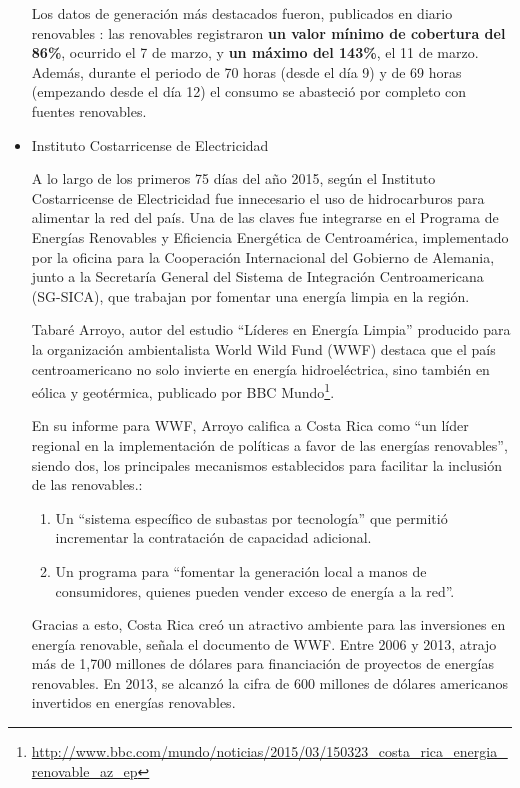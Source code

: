 \begin{itemize}
  Los datos de generación más destacados fueron, publicados en diario
  renovables \cite{sfdez18}: las renovables registraron \textbf{un valor mínimo de
  cobertura del 86\%}, ocurrido el 7 de marzo, y \textbf{un máximo del
  143\%}, el 11 de marzo. Además, durante el periodo de 70 horas (desde
  el día 9) y de 69 horas (empezando desde el día 12) el consumo se
  abasteció por completo con fuentes renovables.
\item
  Instituto Costarricense de Electricidad

  A lo largo de los primeros 75 días del año 2015, según el Instituto
  Costarricense de Electricidad fue innecesario el uso de hidrocarburos
  para alimentar la red del país. Una de las claves fue integrarse en el
  Programa de Energías Renovables y Eficiencia Energética de
  Centroamérica, implementado por la oficina para la Cooperación
  Internacional del Gobierno de Alemania, junto a la Secretaría General
  del Sistema de Integración Centroamericana (SG-SICA), que trabajan por
  fomentar una energía limpia en la región.

  Tabaré Arroyo, autor del estudio ``Líderes en Energía Limpia'' producido
  para la organización ambientalista World Wild Fund (WWF) destaca que
  el país centroamericano no solo invierte en energía hidroeléctrica,
  sino también en eólica y geotérmica, publicado por BBC
  Mundo\footnote{\url{http://www.bbc.com/mundo/noticias/2015/03/150323_costa_rica_energia_renovable_az_ep}}.

  En su informe para WWF, Arroyo califica a Costa Rica como ``un líder
  regional en la implementación de políticas a favor de las energías
  renovables'', siendo dos, los principales mecanismos establecidos para
  facilitar la inclusión de las renovables.:

  \begin{enumerate}
  \def\labelenumi{\arabic{enumi}.}
  \item
    Un ``sistema específico de subastas por tecnología'' que permitió
    incrementar la contratación de capacidad adicional.
  \item
    Un programa para ``fomentar la generación local a manos de
    consumidores, quienes pueden vender exceso de energía a la red''.
  \end{enumerate}

  Gracias a esto, Costa Rica creó un atractivo ambiente para las
  inversiones en energía renovable, señala el documento de WWF. Entre
  2006 y 2013, atrajo más de 1,700 millones de dólares para financiación
  de proyectos de energías renovables. En 2013, se alcanzó la cifra de
  600 millones de dólares americanos invertidos en energías renovables.


\end{itemize}
